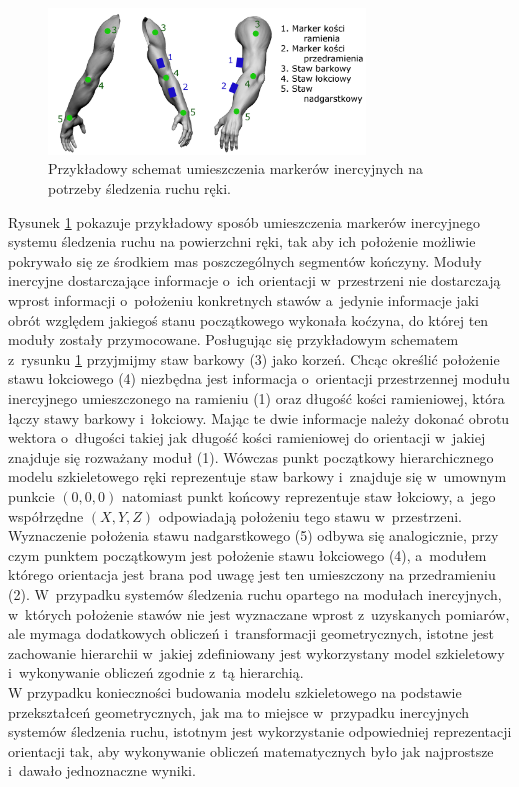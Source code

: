 \begin{figure}[!htp]
	\centering	
	\includegraphics[width=0.75\textwidth]{images/imuArm.png}
	\caption{Przykładowy schemat umieszczenia markerów inercyjnych na potrzeby śledzenia ruchu ręki.}
	\label{fig:literature:imuMarkerPlacementSample}
\end{figure}
		
Rysunek \ref{fig:literature:imuMarkerPlacementSample} pokazuje przykładowy sposób umieszczenia markerów inercyjnego systemu śledzenia ruchu na powierzchni ręki, tak aby ich położenie możliwie pokrywało się ze środkiem mas poszczególnych segmentów kończyny. 
Moduły inercyjne dostarczające informacje o~ich orientacji w~przestrzeni 
nie dostarczają wprost informacji o~położeniu konkretnych stawów a~jedynie informacje jaki obrót względem jakiegoś stanu początkowego wykonała koćzyna, do której ten moduły zostały przymocowane. Posługując się przykładowym schematem z~rysunku \ref{fig:literature:imuMarkerPlacementSample} przyjmijmy staw barkowy (3) jako korzeń. Chcąc określić położenie stawu łokciowego (4) niezbędna jest informacja o~orientacji przestrzennej modułu inercyjnego umieszczonego na ramieniu (1) oraz długość kości ramieniowej, która łączy stawy barkowy i~łokciowy. Mając te dwie informacje należy dokonać obrotu wektora o~długości takiej jak długość kości ramieniowej do orientacji w~jakiej znajduje się rozważany moduł (1). Wówczas punkt początkowy hierarchicznego modelu szkieletowego ręki
reprezentuje staw barkowy i~znajduje się w~umownym punkcie $(0 , 0 , 0)$ natomiast punkt końcowy reprezentuje staw łokciowy, a~jego współrzędne $(X , Y , Z)$ odpowiadają położeniu tego stawu w~przestrzeni. Wyznaczenie położenia stawu nadgarstkowego (5) odbywa się analogicznie, przy czym punktem początkowym jest położenie stawu łokciowego (4), a~modułem którego orientacja jest brana pod uwagę jest ten umieszczony na przedramieniu (2). W~przypadku systemów śledzenia ruchu opartego na modułach inercyjnych, w~których położenie stawów nie jest wyznaczane wprost z~uzyskanych pomiarów, ale mymaga dodatkowych obliczeń i~transformacji geometrycznych, istotne jest zachowanie hierarchii w~jakiej zdefiniowany jest wykorzystany model szkieletowy i~wykonywanie obliczeń zgodnie z~tą hierarchią.\\
W przypadku konieczności budowania modelu szkieletowego na podstawie przekształceń geometrycznych, jak ma to miejsce w~przypadku inercyjnych systemów śledzenia ruchu, istotnym jest wykorzystanie odpowiedniej reprezentacji orientacji tak, aby wykonywanie obliczeń matematycznych było jak najprostsze i~dawało jednoznaczne wyniki.
		
